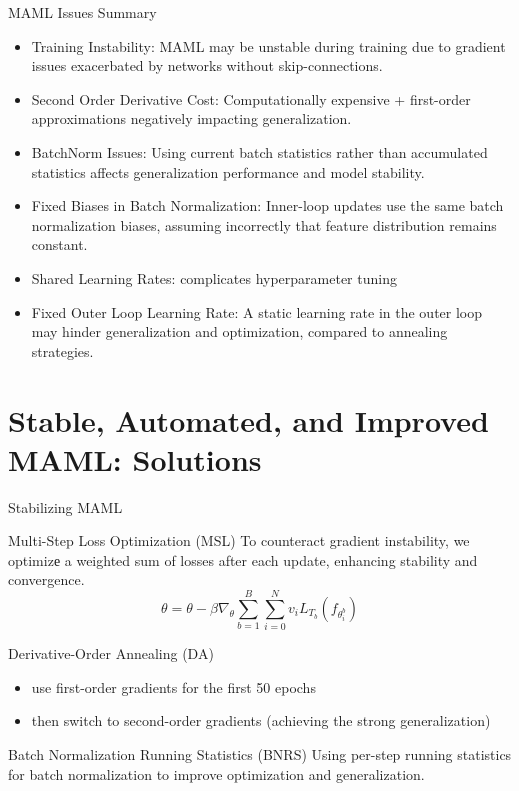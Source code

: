 \documentclass{beamer}
\begin{document}
\begin{frame}{MAML Issues Summary}
    \begin{block}{}
        \begin{itemize}
            \item Training Instability: MAML may be unstable during training due to gradient issues exacerbated by networks without skip-connections.
            \item Second Order Derivative Cost: Computationally expensive + first-order approximations negatively impacting generalization.
            \item BatchNorm Issues: Using current batch statistics rather than accumulated statistics affects generalization performance and model stability.
            \item Fixed Biases in Batch Normalization: Inner-loop updates use the same batch normalization biases, assuming incorrectly that feature distribution remains constant.
            \item Shared Learning Rates: %
            complicates hyperparameter tuning %
            \item Fixed Outer Loop Learning Rate: A static learning rate in the outer loop may hinder generalization and optimization, compared to annealing strategies.
        \end{itemize}
    \end{block}
\end{frame}

\section{Stable, Automated, and Improved MAML: Solutions}
\begin{frame}{Stabilizing MAML}
\begin{block}{Multi-Step Loss Optimization (MSL)}
To counteract gradient instability, we optimizе a weighted sum of losses after each update, enhancing stability and convergence.
\begin{equation}
\theta = \theta - \beta\nabla_\theta \sum_{b=1}^B \sum_{i=0}^N v_i L_{T_b}(f_{\theta^b_i})
\end{equation}
\end{block}

\begin{block}{Derivative-Order Annealing (DA)}
    \begin{itemize}{}
        \item use first-order gradients for the first 50 epochs
        \item then switch to second-order gradients (achieving the strong generalization)
    \end{itemize}
\end{block}
\begin{block}{Batch Normalization Running Statistics (BNRS)}
    Using per-step running statistics for batch normalization to improve optimization and generalization.
\end{block}
\end{frame}
\end{document}
